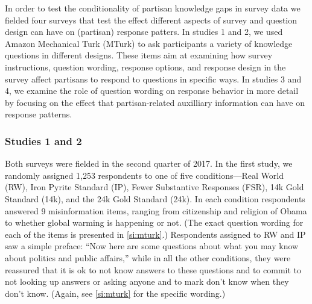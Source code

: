 \documentclass[12pt, letterpaper]{article}
\begin{document}
In order to test the conditionality of partisan knowledge gaps in survey data we fielded four surveys that test the effect different aspects of survey and question design can have on (partisan) response patters. In studies 1 and 2, we used Amazon Mechanical Turk (MTurk) to ask participants a variety of knowledge questions in different designs. These items aim at examining how survey instructions, question wording, response options, and response design in the survey affect partisans to respond to questions in specific ways. In studies 3 and 4, we examine the role of question wording on response behavior in more detail by focusing on the effect that partisan-related auxilliary information can have on response patterns.

\subsubsection*{Studies 1 and 2}

Both surveys were fielded in the second quarter of 2017. In the first study, we randomly assigned 1,253 respondents to one of five conditions—Real World (RW), Iron Pyrite Standard (IP), Fewer Substantive Responses (FSR), 14k Gold Standard (14k), and the 24k Gold Standard (24k). In each condition respondents answered 9 misinformation items, ranging from citizenship and religion of Obama to whether global warming is happening or not. (The exact question wording for each of the items is presented in \cref{si:mturk}.) Respondents assigned to RW and IP saw a simple preface: ``Now here are some questions about what you may know about politics and public affairs,'' while in all the other conditions, they were reassured that it is ok to not know answers to these questions and to commit to not looking up answers or asking anyone and to mark don't know when they don’t know. (Again, see \cref{si:mturk} for the specific wording.)
\end{document}

